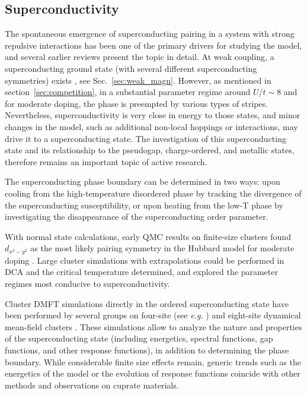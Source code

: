 \documentclass{ar-1col}
\begin{document}
\subsection{Superconductivity}
The spontaneous emergence of superconducting pairing in a system with strong repulsive interactions has been one of the primary drivers for studying the model, and several earlier reviews \cite{Dagotto94,Bulut02,Maier05A,Tremblay06,Scalapino07} present the topic in detail. At weak coupling, a superconducting ground state (with several different superconducting symmetries) exists \cite{Metzner12,Raghu10,Deng15,Simkovic19}, see Sec.~\ref{sec:weak_magn}. However, as mentioned in section~\ref{sec:competition}, in a substantial parameter regime around $U/t\!\sim\!8$ and for moderate doping, the phase is preempted by various types of stripes. Nevertheless, superconductivity is very close in energy to those states, and minor changes in the model, such as additional non-local hoppings or interactions, may drive it to a superconducting state.
The investigation of this superconducting state and its relationship to the pseudogap, charge-ordered, and metallic states, therefore remains an important topic of active research.

The  superconducting phase boundary can be determined in two ways: upon cooling from the high-temperature disordered phase by tracking the divergence of the superconducting susceptibility, or upon heating from the low-T phase by investigating the disappearance of the superconducting order parameter.

With normal state calculations, early QMC results on finite-size clusters found $d_{x^2-y^2}$ as the most likely pairing symmetry in the Hubbard model for moderate doping \cite{White89B}. Large cluster simulations with extrapolations could be performed in DCA \cite{Maier05B} and the critical temperature determined, and \cite{Chen15} explored the parameter regimes most conducive to superconductivity.

Cluster DMFT simulations directly in the ordered superconducting state have been performed by several groups on four-site (see {\it e.g.} \cite{Lichtenstein00,Maier04,Haule07,Civelli09,Sordi12}) and eight-site dynamical mean-field clusters \cite{Gull13,Gull12}. These simulations allow to analyze the nature and properties of the superconducting state (including energetics, spectral functions, gap functions, and other response functions), in addition to determining the phase boundary. While considerable finite size effects remain, generic trends such as the energetics of the model or the evolution of response functions coincide with other methods and observations on cuprate materials.
\end{document}
